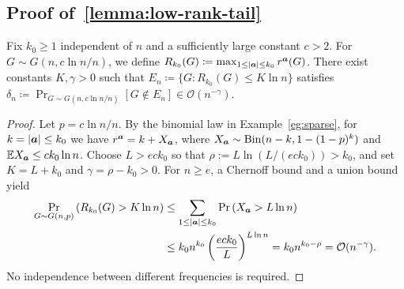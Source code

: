 \documentclass{article}
\theoremstyle{plain}
\theoremstyle{definition}
\theoremstyle{remark}
\begin{document}
\subsection{Proof of~\cref{lemma:low-rank-tail}}
\label{app:low-rank-tail}
Fix $k_0 \geq 1$ independent of $n$ and a sufficiently large constant
$c>2$. For $G\sim G(n,c\ln n/n)$, we define $R_{k_0}(G) \coloneqq \max_{1\leq\abs{{\bm{a}}}\leq k_0}r^{{\bm{a}}}(G)$.
There exist constants $K,\gamma>0$ such that $E_n \coloneqq \{G \colon R_{k_0}(G)\leq K\ln n\}$ satisfies $\delta_n \coloneqq\Pr_{G\sim G(n,c\ln n/n)}[G\notin E_n] \in \mathcal{O}(n^{-\gamma})$.
\begin{proof}
Let $p=c\ln n/n$. By the binomial law in Example~\ref{eg:sparse}, for $k=\abs{{\bm{a}}}\leq k_0$ we have $r^{{\bm{a}}}=k+X_{{\bm{a}}}$, where $X_{{\bm{a}}}\sim\operatorname{Bin}(n-k,1-(1-p)^k)$ and $\mathbb{E} X_{{\bm{a}}}\leq c k_0\ln n$. Choose $L>ec k_0$ so that $\rho:=L\ln(L/(ec k_0))>k_0$, and set $K=L+k_0$ and $\gamma=\rho-k_0>0$. For $n\geq e$, a Chernoff bound and a union bound yield
\begin{align}
 \Pr_{G\sim G(n,p)}\left(R_{k_0}(G)>K\ln n\right)
 &\leq\sum_{1\leq\abs{{\bm{a}}}\leq k_0}\Pr\left( X_{{\bm{a}}}>L\ln n \right) \nonumber\\
 &\leq k_0 n^{k_0}\left(\frac{ec k_0}{L}\right)^{L\ln n} = k_0n^{k_0-\rho} = \mathcal{O}(n^{-\gamma}).
 \label{eq:low-rank-rank-tail}
\end{align}
No independence between different frequencies is required.
\end{proof}
\end{document}
